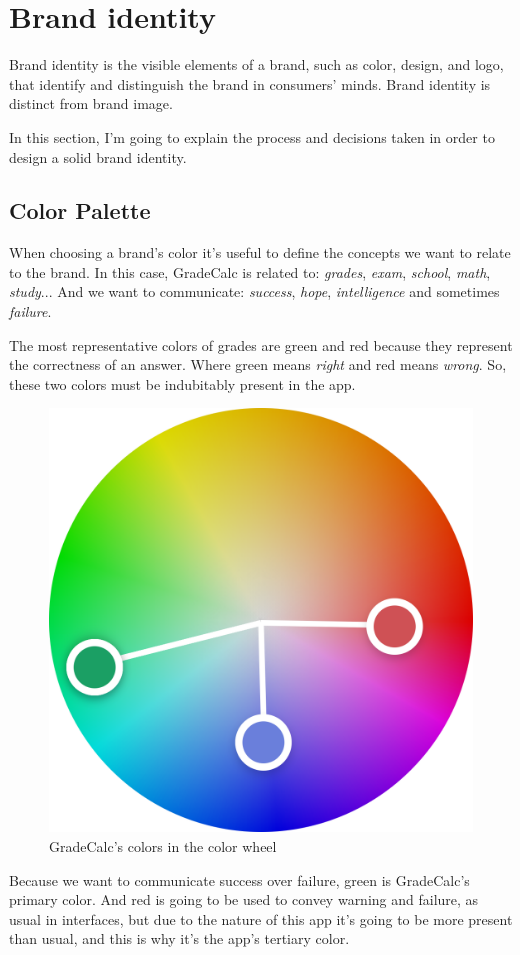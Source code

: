 \newpage
\section{Brand identity}
\label{sec:brand}

Brand identity is the visible elements of a brand, such as color, design, and logo, that identify and distinguish the brand in consumers' minds. Brand identity is distinct from brand image.\cite{brand-identity}

In this section, I'm going to explain the process and decisions taken in order to design a solid brand identity.

\subsection{Color Palette}

When choosing a brand's color it's useful to define the concepts we want to relate to the brand. In this case, GradeCalc is related to: \textit{grades}, \textit{exam}, \textit{school}, \textit{math}, \textit{study}... And we want to communicate: \textit{success}, \textit{hope}, \textit{intelligence} and sometimes \textit{failure}.

The most representative colors of grades are green and red because they represent the correctness of an answer. Where green means \textit{right} and red means \textit{wrong}. So, these two colors must be indubitably present in the app. 

\vfill
\begin{figure}[ht!]
    \center
    \includegraphics[width=0.3333\columnwidth]{media/color-palette-wheel.png}
    \caption{GradeCalc's colors in the color wheel}
    \label{fig:color-palette-wheel}
\end{figure}
\vfill

\newpage
Because we want to communicate success over failure, green is GradeCalc's primary color. And red is going to be used to convey warning and failure, as usual in interfaces, but due to the nature of this app it's going to be more present than usual, and this is why it's the app's tertiary color.

